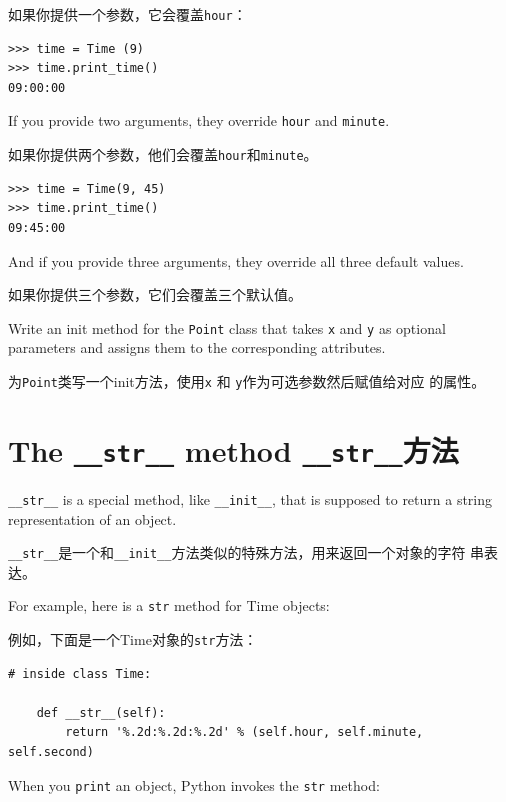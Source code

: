 \documentclass[10pt]{book}
\begin{document}
\begin{CJK}{UTF8}{gbsn}
如果你提供一个参数，它会覆盖{\tt hour}：

\begin{verbatim}
>>> time = Time (9)
>>> time.print_time()
09:00:00
\end{verbatim}
%
If you provide two arguments, they override {\tt hour} and
{\tt minute}.

如果你提供两个参数，他们会覆盖{\tt hour}和{\tt minute}。

\begin{verbatim}
>>> time = Time(9, 45)
>>> time.print_time()
09:45:00
\end{verbatim}
%
And if you provide three arguments, they override all three
default values.

如果你提供三个参数，它们会覆盖三个默认值。


\begin{exercise}

Write an init method for the {\tt Point} class that takes
{\tt x} and {\tt y} as optional parameters and assigns
them to the corresponding attributes.

为{\tt Point}类写一个init方法，使用{\tt x} 和 {\tt y}作为可选参数然后赋值给对应
的属性。

\end{exercise}


\section{The {\tt \_\_str\_\_} method {\tt \_\_str\_\_}方法}

\verb"__str__" is a special method, like \verb"__init__",
that is supposed to return a string representation of an object.

\verb"__str__"是一个和\verb"__init__"方法类似的特殊方法，用来返回一个对象的字符
串表达。

For example, here is a {\tt str} method for Time objects:

例如，下面是一个Time对象的{\tt str}方法：

\begin{verbatim}
# inside class Time:

    def __str__(self):
        return '%.2d:%.2d:%.2d' % (self.hour, self.minute, self.second)
\end{verbatim}
%
When you {\tt print} an object, Python invokes the {\tt str} method:


\end{CJK}
\end{document}
